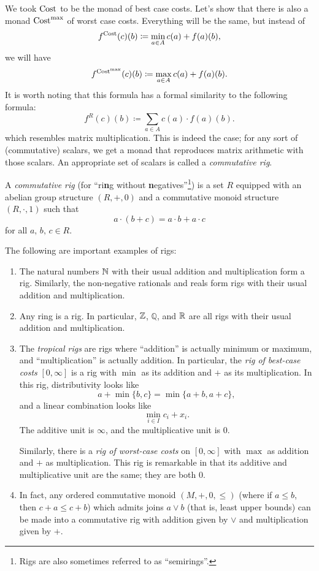 \documentclass[DynamicalBook]{subfiles}
\begin{document}
We took $\mathrm{Cost}$ to be the monad of best case costs. Let's show that there
is also a monad $\mathrm{Cost}^{\max}$ of worst case costs. Everything will be the same, but instead of
\[f^{\mathrm{Cost}}(c)(b) \coloneqq \min_{a \in A} c(a) + f(a)(b),\]
we will have
\[
f^{\mathrm{Cost}^{\max}}(c)(b) \coloneqq \max_{a \in A} c(a) + f(a)(b).
\]
It is worth noting that this formula has a formal similarity to the following
formula:
\[
f^{R}(c)(b) \coloneqq \sum_{a \in A} c(a)\cdot f(a)(b).
\]
which resembles matrix multiplication. This is indeed the case; for any sort of
(commutative) scalars, we get a monad that reproduces matrix arithmetic with
those scalars. An appropriate set of scalars is called a \emph{commutative rig}.

\begin{definition}
A \emph{commutative rig} (for ``ri{\textbf{n}}g without
{\textbf{n}}egatives''\footnote{Rigs are also sometimes referred to as ``semirings''.}) is a set $R$
equipped with an abelian group structure $(R, +, 0)$ and a commutative monoid structure $(R,
\cdot, 1)$ such that
\[
a \cdot (b + c) = a \cdot b + a \cdot c
\]
for all $a,\, b,\, c\in R$.
\end{definition}

\begin{example}
  The following are important examples of rigs:
  \begin{enumerate}
    \item The natural numbers $\mathbb{N}$ with their usual addition and multiplication
      form a rig. Similarly, the non-negative rationals and reals form rigs with
      their usual addition and multiplication. 
    \item Any ring is a rig. In particular, $\mathbb{Z}$, $\mathbb{Q}$, and $\mathbb{R}$ are all rigs
      with their usual addition and multiplication.
    \item The \emph{tropical rigs} are rigs where ``addition'' is actually
      minimum or maximum, and ``multiplication'' is actually addition. In
      particular, the \emph{rig of best-case costs} $[0, \infty]$ is a rig with $\min$ as its addition and $+$ as
      its multiplication. In this rig, distributivity looks like
      \[
a + \min\{b, c\} = \min\{a + b, a + c\},
      \]
      and a linear combination looks like
      \[ \min_{i \in I} c_i + x_i.\]
      The additive unit is $\infty$, and the multiplicative unit is $0$.

      Similarly, there is a \emph{rig of worst-case costs} on $[0,\infty]$ with
      $\max$ as addition and $+$ as multiplication. This rig is remarkable in
      that its additive and multiplicative unit are the same; they are both $0$.
   \item In fact, any ordered commutative monoid $(M, +, 0, \leq)$ (where if $a \leq
     b$, then $c + a \leq c + b$) which admits joins $a \vee b$ (that is, least
     upper bounds) can be made into a commutative rig with addition given by
     $\vee$ and multiplication given by $+$.
  \end{enumerate}
\end{example}
\end{document}
